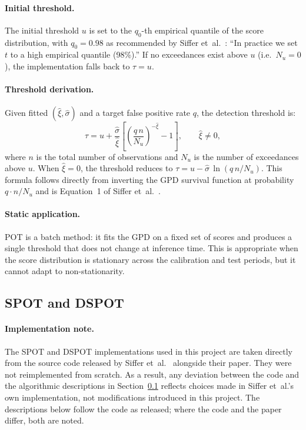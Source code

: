 \documentclass[11pt]{report}
\begin{document}
\paragraph{Initial threshold.}
The initial threshold $u$ is set to the $q_0$-th empirical quantile of the score distribution, with $q_0 = 0.98$ as recommended by Siffer et~al.~\cite{siffer:hal-01640325}: ``In practice we set $t$ to a high empirical quantile (98\%).'' If no exceedances exist above $u$ (i.e.\ $N_u = 0$), the implementation falls back to $\tau = u$.

\paragraph{Threshold derivation.}
Given fitted $(\hat{\xi}, \hat{\sigma})$ and a target false positive rate $q$, the detection threshold is:
\begin{equation}
  \label{eq:pot_threshold}
  \tau = u + \frac{\hat{\sigma}}{\hat{\xi}} \left[\left(\frac{q\,n}{N_u}\right)^{-\hat{\xi}} - 1\right], \qquad \hat{\xi} \neq 0,
\end{equation}
where $n$ is the total number of observations and $N_u$ is the number of exceedances above $u$. When $\hat{\xi} = 0$, the threshold reduces to $\tau = u - \hat{\sigma}\,\ln(q\,n / N_u)$. This formula follows directly from inverting the GPD survival function at probability $q \cdot n / N_u$ and is Equation~1 of Siffer et~al.~\cite{siffer:hal-01640325}.

\paragraph{Static application.}
POT is a batch method: it fits the GPD on a fixed set of scores and produces a single threshold that does not change at inference time. This is appropriate when the score distribution is stationary across the calibration and test periods, but it cannot adapt to non-stationarity.

\subsection{SPOT and DSPOT}\label{sec:methodology:thresholds:spot}

\paragraph{Implementation note.}
The SPOT and DSPOT implementations used in this project are taken directly from the source code released by Siffer et~al.~\cite{siffer:hal-01640325} alongside their paper. They were not reimplemented from scratch. As a result, any deviation between the code and the algorithmic descriptions in Section~\ref{sec:methodology:thresholds:spot} reflects choices made in Siffer et~al.'s own implementation, not modifications introduced in this project. The descriptions below follow the code as released; where the code and the paper differ, both are noted.
\end{document}
